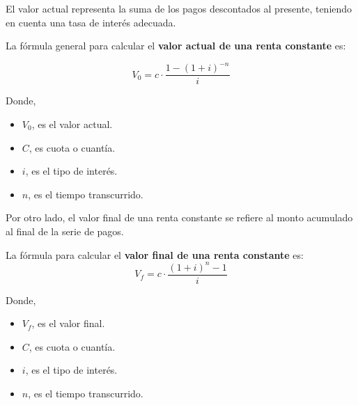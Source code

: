 \documentclass[
  letterpaper,
  DIV=11,
  numbers=noendperiod]{scrreprt}
\begin{document}
\begin{tcolorbox}
El valor actual representa la suma de los pagos descontados al presente,
teniendo en cuenta una tasa de interés adecuada.

\begin{tcolorbox}[enhanced jigsaw, toprule=.15mm, left=2mm, arc=.35mm, breakable, bottomrule=.15mm, opacityback=0, rightrule=.15mm, leftrule=.75mm, colframe=quarto-callout-note-color-frame, colback=white]
\begin{minipage}[t]{5.5mm}
\textcolor{quarto-callout-note-color}{\faInfo}
\end{minipage}%
\begin{minipage}[t]{\textwidth - 5.5mm}

La fórmula general para calcular el \textbf{valor actual de una renta
constante} es:

\[V_0=c\cdot\frac{1-\left(1+i\right)^{-n}}{i}\]

Donde,

\begin{itemize}
\item
  \(V_0\), es el valor actual.
\item
  \(C\), es cuota o cuantía.
\item
  \(i\), es el tipo de interés.
\item
  \(n\), es el tiempo transcurrido.
\end{itemize}

\end{minipage}%
\end{tcolorbox}

Por otro lado, el valor final de una renta constante se refiere al monto
acumulado al final de la serie de pagos.

\begin{tcolorbox}[enhanced jigsaw, toprule=.15mm, left=2mm, arc=.35mm, breakable, bottomrule=.15mm, opacityback=0, rightrule=.15mm, leftrule=.75mm, colframe=quarto-callout-note-color-frame, colback=white]
\begin{minipage}[t]{5.5mm}
\textcolor{quarto-callout-note-color}{\faInfo}
\end{minipage}%
\begin{minipage}[t]{\textwidth - 5.5mm}

La fórmula para calcular el \textbf{valor final de una renta constante}
es: \[V_f=c\cdot\frac{\left(1+i\right)^{n}-1}{i}\]

Donde,

\begin{itemize}
\item
  \(V_f\), es el valor final.
\item
  \(C\), es cuota o cuantía.
\item
  \(i\), es el tipo de interés.
\item
  \(n\), es el tiempo transcurrido.
\end{itemize}


\end{minipage}
\end{tcolorbox}
\end{tcolorbox}
\end{document}

